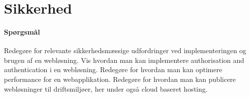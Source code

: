 \section{Sikkerhed}

\paragraph{Spørgsmål}
Redegøre for relevante sikkerhedsmæssige udfordringer ved implementeringen og brugen af en webløsning. Vis hvordan man kan implementere authorisation and authentication i en webløsning. Redegøre for hvordan man kan optimere performance for en webapplikation. Redegøre for hvordan man kan publicere webløsninger til driftsmiljøer, her under også cloud baseret hosting.